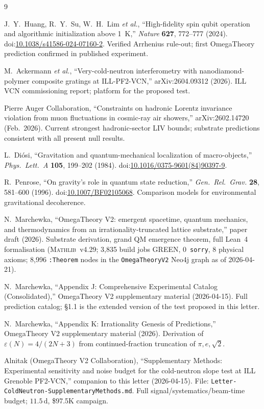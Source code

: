 \documentclass[aps,prl,twocolumn,superscriptaddress,nofootinbib,10pt]{revtex4-2}
\newcommand{\eps}{\varepsilon}
\newcommand{\mathlibv}{\textsc{Mathlib}~v4.29}
\begin{document}
\begin{thebibliography}{9}

J.~Y.~Huang, R.~Y.~Su, W.~H.~Lim \emph{et al.},
``High-fidelity spin qubit operation and algorithmic initialization
above 1~K,'' \emph{Nature} \textbf{627}, 772--777 (2024).
doi:\href{https://doi.org/10.1038/s41586-024-07160-2}{10.1038/s41586-024-07160-2}.
Verified Arrhenius rule-out; first OmegaTheory prediction confirmed
in published experiment.

M.~Ackermann \emph{et al.},
``Very-cold-neutron interferometry with nanodiamond-polymer composite
gratings at ILL-PF2-VCN,'' arXiv:2604.09312 (2026).
ILL VCN commissioning report; platform for the proposed test.

Pierre Auger Collaboration,
``Constraints on hadronic Lorentz invariance violation from muon
fluctuations in cosmic-ray air showers,'' arXiv:2602.14720 (Feb.\ 2026).
Current strongest hadronic-sector LIV bounds; substrate predictions
consistent with all present null results.

L.~Di\'osi,
``Gravitation and quantum-mechanical localization of macro-objects,''
\emph{Phys.\ Lett.\ A} \textbf{105}, 199--202 (1984).
doi:\href{https://doi.org/10.1016/0375-9601(84)90397-9}{10.1016/0375-9601(84)90397-9}.

R.~Penrose,
``On gravity's role in quantum state reduction,''
\emph{Gen.\ Rel.\ Grav.} \textbf{28}, 581--600 (1996).
doi:\href{https://doi.org/10.1007/BF02105068}{10.1007/BF02105068}.
Comparison models for environmental gravitational decoherence.

N.~Marchewka,
``OmegaTheory V2: emergent spacetime, quantum mechanics, and
thermodynamics from an irrationality-truncated lattice substrate,''
paper draft (2026).
Substrate derivation, grand QM emergence theorem, full Lean~4
formalisation (\mathlibv; 3{,}835 build jobs GREEN, 0~\texttt{sorry},
8 physical axioms; 8{,}996 \texttt{:Theorem} nodes in the
\texttt{OmegaTheoryV2} Neo4j graph as of 2026-04-21).

N.~Marchewka,
``Appendix J: Comprehensive Experimental Catalog (Consolidated),''
OmegaTheory V2 supplementary material (2026-04-15).
Full prediction catalog; \S1.1 is the extended version of the test
proposed in this letter.

N.~Marchewka,
``Appendix K: Irrationality Genesis of Predictions,''
OmegaTheory V2 supplementary material (2026).
Derivation of $\eps(N) = 4/(2N+3)$ from continued-fraction truncation
of $\pi, e, \sqrt{2}$.

Alnitak (OmegaTheory V2 Collaboration),
``Supplementary Methods: Experimental sensitivity and noise budget
for the cold-neutron slope test at ILL Grenoble PF2-VCN,''
companion to this letter (2026-04-15).
File: \texttt{Letter-ColdNeutron-SupplementaryMethods.md}.
Full signal/systematics/beam-time budget; $11.5$\,d, \$97.5K campaign.

\end{thebibliography}
\end{document}
